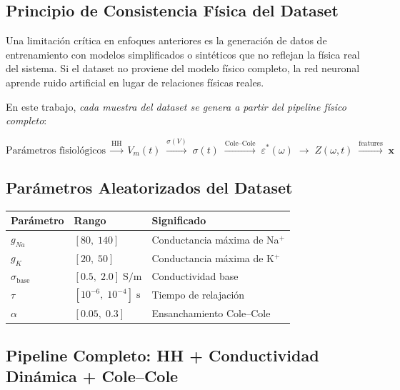 \documentclass[12pt]{article}
\begin{document}
\subsection{Principio de Consistencia F\'isica del Dataset}

Una limitaci\'on cr\'itica en enfoques anteriores es la generaci\'on de datos de entrenamiento
con modelos simplificados o sint\'eticos que no reflejan la f\'isica real del sistema. Si el
dataset no proviene del modelo f\'isico completo, la red neuronal aprende ruido artificial
en lugar de relaciones f\'isicas reales.

En este trabajo, \emph{cada muestra del dataset se genera a partir del pipeline f\'isico
completo}:

\begin{equation}
\text{Par\'ametros fisiol\'ogicos}
\;\xrightarrow{\text{HH}}\;
V_m(t)
\;\xrightarrow{\sigma(V)}\;
\sigma(t)
\;\xrightarrow{\text{Cole--Cole}}\;
\varepsilon^*(\omega)
\;\xrightarrow{}\;
Z(\omega,t)
\;\xrightarrow{\text{features}}\;
\mathbf{x}
\end{equation}

\subsection{Par\'ametros Aleatorizados del Dataset}

\begin{center}
\renewcommand{\arraystretch}{1.3}
\begin{tabular}{@{}lll@{}}
\toprule
\textbf{Par\'ametro} & \textbf{Rango} & \textbf{Significado} \\
\midrule
$g_{Na}$ & $[80,\;140]$ & Conductancia m\'axima de Na$^+$ \\
$g_K$ & $[20,\;50]$ & Conductancia m\'axima de K$^+$ \\
$\sigma_{\text{base}}$ & $[0.5,\;2.0]\;\text{S/m}$ & Conductividad base \\
$\tau$ & $[10^{-6},\;10^{-4}]\;\text{s}$ & Tiempo de relajaci\'on \\
$\alpha$ & $[0.05,\;0.3]$ & Ensanchamiento Cole--Cole \\
\bottomrule
\end{tabular}
\end{center}

\subsection{Pipeline Completo: HH + Conductividad Din\'amica + Cole--Cole}
\end{document}
